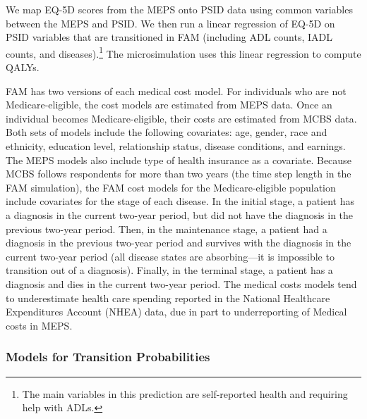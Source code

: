 We map EQ-5D scores from the MEPS onto PSID data using common variables between the MEPS and PSID. We then run a linear regression of EQ-5D on PSID variables that are transitioned in FAM (including ADL counts, IADL counts, and diseases).\footnote{The main variables in this prediction are self-reported health and requiring help with ADLs.} The microsimulation uses this linear regression to compute QALYs.
%


\noindent FAM has two versions of each medical cost model. For individuals who are not Medicare-eligible, the cost models are estimated from MEPS data.
Once an individual becomes Medicare-eligible, their costs are estimated from MCBS data. Both sets of models include the following covariates:
age, gender, race and ethnicity, education level, relationship status, disease conditions, and earnings.
The MEPS models also include type of health insurance as a covariate.
Because MCBS follows respondents for more than two years (the time step length in the FAM simulation), the FAM cost models for the Medicare-eligible population include covariates for the stage of each disease.
In the initial stage, a patient has a diagnosis in the current two-year period, but did not have the diagnosis in the previous two-year period.
Then, in the maintenance stage, a patient had a diagnosis in the previous two-year period and survives with the diagnosis in the current two-year period (all disease states are absorbing---it is impossible to transition out of a diagnosis).
Finally, in the terminal stage, a patient has a diagnosis and dies in the current two-year period.
The medical costs models tend to underestimate health care spending reported in the National Healthcare Expenditures Account (NHEA) data, due in part to underreporting of Medical costs in MEPS.

\subsubsection{Models for Transition Probabilities}
\label{section:transition_models}

